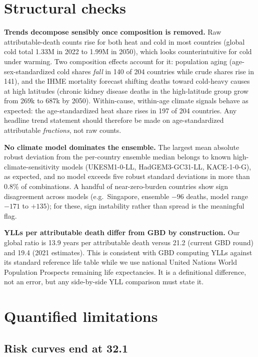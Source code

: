 \documentclass[11pt]{ozreport}
\begin{document}
\section{Structural checks}

\textbf{Trends decompose sensibly once composition is removed.} Raw
attributable-death counts rise for both heat and cold in most countries
(global cold total 1.33M in 2022 to 1.99M in 2050), which looks
counterintuitive for cold under warming. Two composition effects account
for it: population aging (age-sex-standardized cold shares \emph{fall} in
140 of 204 countries while crude shares rise in 141), and the IHME mortality
forecast shifting deaths toward cold-heavy causes at high latitudes (chronic
kidney disease deaths in the high-latitude group grow from 269k to 687k by
2050). Within-cause, within-age climate signals behave as expected: the
age-standardized heat share rises in 197 of 204 countries. Any headline
trend statement should therefore be made on age-standardized attributable
\emph{fractions}, not raw counts.

\textbf{No climate model dominates the ensemble.} The largest mean absolute
robust deviation from the per-country ensemble median belongs to known
high-climate-sensitivity models (UKESM1-0-LL, HadGEM3-GC31-LL, KACE-1-0-G),
as expected, and no model exceeds five robust standard deviations in more
than 0.8\% of combinations. A handful of near-zero-burden countries show
sign disagreement across models (e.g.\ Singapore, ensemble $-96$ deaths,
model range $-171$ to $+135$); for these, sign instability rather than
spread is the meaningful flag.

\textbf{YLLs per attributable death differ from GBD by construction.} Our
global ratio is 13.9 years per attributable death versus 21.2 (current GBD
round) and 19.4 (2021 estimates). This is consistent with GBD computing
YLLs against its standard reference life table while we use national United
Nations World Population Prospects remaining life expectancies. It is a
definitional difference, not an error, but any side-by-side YLL comparison
must state it.

\section{Quantified limitations}\label{sec:limits}

\subsection{Risk curves end at 32.1\,\textcelsius{}}
\end{document}
